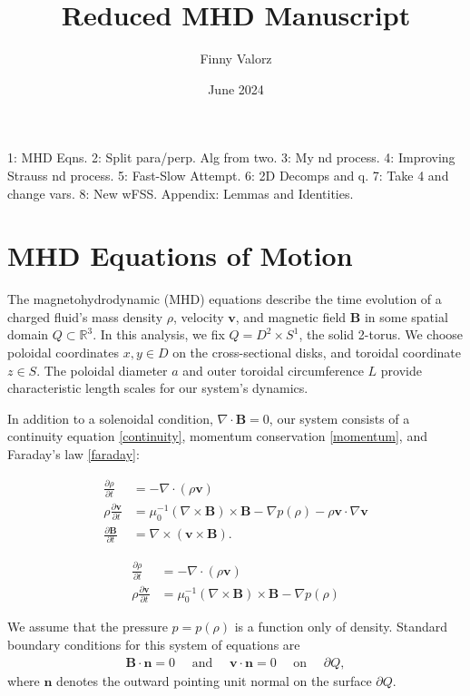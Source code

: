\documentclass{article}
\title{Reduced MHD Manuscript}
\author{Finny Valorz}
\date{June 2024}
\newcommand{\p}{\partial}
\newcommand{\deriv}[2]{\frac{\p #1}{\p #2}}
\newcommand{\pth} [1] {\left( #1 \right) }
\begin{document}
\maketitle


\begin{abstract}
    
\end{abstract}

1: MHD Eqns. 2: Split para/perp. Alg from two. 3: My nd process. 4: Improving Strauss nd process. 5: Fast-Slow Attempt. 6: 2D Decomps and q. 7: Take 4 and change vars. 8: New wFSS. Appendix: Lemmas and Identities. 

\section{MHD Equations of Motion} 
The magnetohydrodynamic (MHD) equations describe the time evolution of a charged fluid's mass density $\rho$, velocity $\bm{v}$, and magnetic field $\bm{B}$ in some spatial domain $Q\subset \mathbb{R}^3$. In this analysis, we fix $Q=D^2\times S^1$, the solid 2-torus. We choose poloidal coordinates $x,y\in D$ on the cross-sectional disks, and toroidal coordinate $z \in S$. The poloidal diameter $a$ and outer toroidal circumference $L$ provide characteristic length scales for our system's dynamics. 

In addition to a solenoidal condition, $\nabla\cdot \bm{B}=0$, our system consists of a continuity equation \eqref{continuity}, momentum conservation \eqref{momentum}, and Faraday's law \eqref{faraday}:

\begin{align}
    \deriv{\rho}{t} &= -\nabla\cdot \pth{\rho \bm{v}} \label{continuity} \\ 
    \rho\deriv{\bm{v}}{t} &= \mu_0^{-1} \pth{\nabla\times \bm{B}} \times \bm{B} - \nabla p(\rho) - \rho \bm{v}\cdot\nabla \bm{v} \label{momentum} \\ 
    \deriv{\bm{B}}{t} &= \nabla \times \pth{\bm{v}\times \bm{B}}. \label{faraday}
\end{align}

\begin{align*}
    \frac{\partial\rho}{\partial t} &= -\nabla\cdot (\rho \bm{v}) \\ 
    \rho \frac{\partial \bm{v}}{\partial t} &= \mu_0^{-1} (\nabla\times\bm{B})\times\bm{B} - \nabla p(\rho) 
\end{align*}

We assume that the pressure $p=p(\rho)$ is a function only of density. Standard boundary conditions for this system of equations are
\begin{align*} 
    \bm{B}\cdot \bm{n} = 0 \quad \text{ and }\quad  \bm{v}\cdot \bm{n} = 0 \quad \text{ on }\quad \p Q,
\end{align*}
where $\bm{n}$ denotes the outward pointing unit normal on the surface $\p Q$. 
\end{document}
